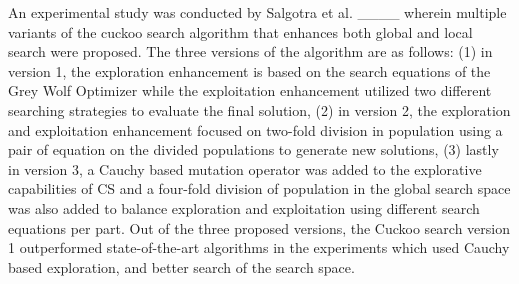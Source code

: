 An experimental study was conducted by Salgotra et al. ____ wherein multiple variants of the cuckoo search algorithm that enhances both global and local search were proposed. The three versions of the algorithm are as follows: (1) in version 1, the exploration enhancement is based on the search equations of the Grey Wolf Optimizer while the exploitation enhancement utilized two different searching strategies to evaluate the final solution, (2) in version 2, the exploration and exploitation enhancement focused on two-fold division in population using a pair of equation on the divided populations to generate new solutions, (3) lastly in version 3, a Cauchy based mutation operator was added to the explorative capabilities of CS and a four-fold division of population in the global search space was also added to balance exploration and exploitation using different search equations per part. Out of the three proposed versions, the Cuckoo search version 1 outperformed state-of-the-art algorithms in the experiments which used Cauchy based exploration, and better search of the search space.